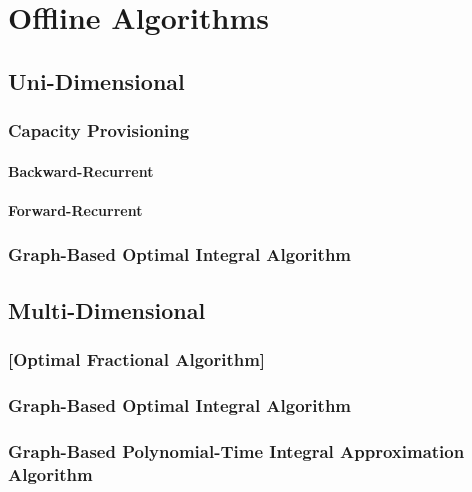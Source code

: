 
\chapter{Offline Algorithms}\label{chapter:algorithms}

\section{Uni-Dimensional}

\subsection{Capacity Provisioning}

\subsubsection{Backward-Recurrent}

\subsubsection{Forward-Recurrent}

\subsection{Graph-Based Optimal Integral Algorithm}

\section{Multi-Dimensional}

\subsection{[Optimal Fractional Algorithm]}

\subsection{Graph-Based Optimal Integral Algorithm}

\subsection{Graph-Based Polynomial-Time Integral Approximation Algorithm}
